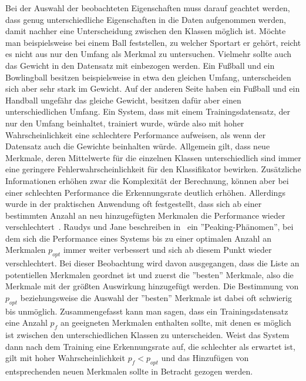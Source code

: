 Bei der Auswahl der beobachteten Eigenschaften muss darauf geachtet werden, dass genug unterschiedliche Eigenschaften in die Daten aufgenommen werden, damit nachher eine Unterscheidung zwischen den Klassen möglich ist. Möchte man beispielsweise bei einem Ball feststellen, zu welcher Sportart er gehört, reicht es nicht aus nur den Umfang als Merkmal zu untersuchen. Vielmehr sollte auch das Gewicht in den Datensatz mit einbezogen werden. Ein Fußball und ein Bowlingball besitzen beispielsweise in etwa den gleichen Umfang, unterscheiden sich aber sehr stark im Gewicht. Auf der anderen Seite haben ein Fußball und ein Handball ungefähr das gleiche Gewicht, besitzen dafür aber einen unterschiedlichen Umfang. Ein System, dass mit einem Trainingsdatensatz, der nur den Umfang beinhaltet, trainiert wurde, würde also mit hoher Wahrscheinlichkeit eine schlechtere Performance aufweisen, als wenn der Datensatz auch die Gewichte beinhalten würde. Allgemein gilt, dass neue Merkmale, deren Mittelwerte für die einzelnen Klassen unterschiedlich sind immer eine geringere Fehlerwahrscheinlichkeit für den Klassifikator bewirken. Zusätzliche Informationen erhöhen zwar die Komplexität der Berechnung, können aber bei einer schlechten Performance die Erkennungsrate deutlich erhöhen. Allerdings wurde in der praktischen Anwendung oft festgestellt, dass sich ab einer bestimmten Anzahl an neu hinzugefügten Merkmalen die Performance wieder verschlechtert~\cite{patternClassification3}. Raudys und Jane beschreiben in~\cite{sampleSize} ein ''Peaking-Phänomen'', bei dem sich die Performance eines Systems bis zu einer optimalen Anzahl an Merkmalen $p_{opt}$ immer weiter verbessert und sich ab diesem Punkt wieder verschlechtert. Bei dieser Beobachtung wird davon ausgegangen, dass die Liste an potentiellen Merkmalen geordnet ist und zuerst die ''besten'' Merkmale, also die Merkmale mit der größten Auswirkung hinzugefügt werden. Die Bestimmung von $p_{opt}$ beziehungsweise die Auswahl der ''besten'' Merkmale ist dabei oft schwierig bis unmöglich. Zusammengefasst kann man sagen, dass ein Trainingsdatensatz eine Anzahl $p_{f}$ an geeigneten Merkmalen enthalten sollte, mit denen es möglich ist zwischen den unterschiedlichen Klassen zu unterscheiden. Weist das System dann nach dem Training eine Erkennungsrate auf, die schlechter als erwartet ist, gilt mit hoher Wahrscheinlichkeit $p_{f}<p_{opt}$ und das Hinzufügen von entsprechenden neuen Merkmalen sollte in Betracht gezogen werden.

